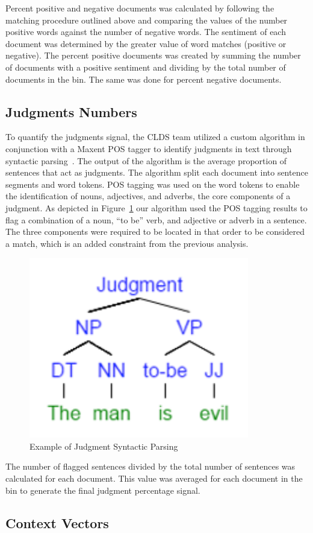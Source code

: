 \documentclass[11pt]{article}
\begin{document}
Percent positive and negative documents was calculated by following the matching procedure outlined above and comparing the values of the number positive words against the number of negative words. The sentiment of each document was determined by the greater value of word matches (positive or negative). The percent positive documents was created by summing the number of documents with a positive sentiment and dividing by the total number of documents in the bin. The same was done for percent negative documents.

\subsection{Judgments Numbers}

To quantify the judgments signal, the CLDS team utilized a custom algorithm in conjunction with a Maxent POS tagger to identify judgments in text through syntactic parsing~\cite{Hornik2011}. The output of the algorithm is the average proportion of sentences that act as judgments. The algorithm split each document into sentence segments and word tokens. POS tagging was used on the word tokens to enable the identification of nouns, adjectives, and adverbs, the core components of a judgment. As depicted in Figure~\ref{fig:judgment} our algorithm used the POS tagging results to flag a combination of a noun, “to be” verb, and adjective or adverb in a sentence. The three components were required to be located in that order to be considered a match, which is an added constraint from the previous analysis. 

\begin{figure}[h]
\begin{center}
\includegraphics[width = .25\textwidth]{figs/judgment}
\caption{Example of Judgment Syntactic Parsing}
\label{fig:judgment}
\end{center}
\end{figure}

The number of flagged sentences divided by the total number of sentences was calculated for each document. This value was averaged for each document in the bin to generate the final judgment percentage signal.

\subsection{Context Vectors}
\label{sect:cv}
\end{document}
